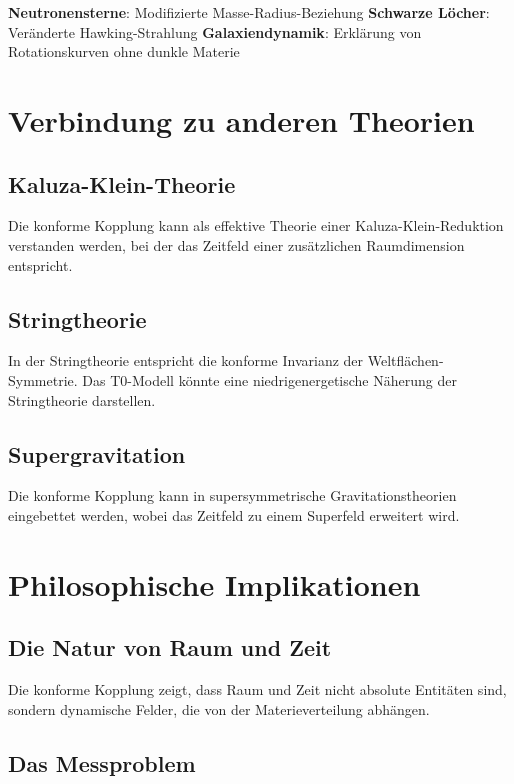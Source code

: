 \documentclass[12pt,a4paper]{report}
\begin{document}
	\textbf{Neutronensterne}: Modifizierte Masse-Radius-Beziehung
	\textbf{Schwarze Löcher}: Veränderte Hawking-Strahlung
	\textbf{Galaxiendynamik}: Erklärung von Rotationskurven ohne dunkle Materie
	
	\section{Verbindung zu anderen Theorien}
	
	\subsection{Kaluza-Klein-Theorie}
	
	Die konforme Kopplung kann als effektive Theorie einer Kaluza-Klein-Reduktion verstanden werden, bei der das Zeitfeld einer zusätzlichen Raumdimension entspricht.
	
	\subsection{Stringtheorie}
	
	In der Stringtheorie entspricht die konforme Invarianz der Weltflächen-Symmetrie. Das T0-Modell könnte eine niedrigenergetische Näherung der Stringtheorie darstellen.
	
	\subsection{Supergravitation}
	
	Die konforme Kopplung kann in supersymmetrische Gravitationstheorien eingebettet werden, wobei das Zeitfeld zu einem Superfeld erweitert wird.
	
	\section{Philosophische Implikationen}
	
	\subsection{Die Natur von Raum und Zeit}
	
	Die konforme Kopplung zeigt, dass Raum und Zeit nicht absolute Entitäten sind, sondern dynamische Felder, die von der Materieverteilung abhängen.
	
	\subsection{Das Messproblem}
	
\end{document}
